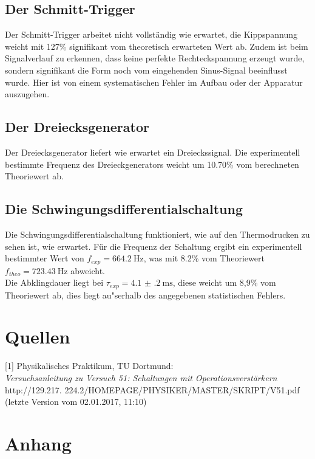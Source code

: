 \documentclass[]{scrartcl}
\let\oldsection\section
\renewcommand\section{\clearpage\oldsection}
\begin{document}
\subsection{Der Schmitt-Trigger}
Der Schmitt-Trigger arbeitet nicht vollständig wie erwartet, die Kippspannung weicht mit 127\% signifikant vom theoretisch erwarteten Wert ab. Zudem ist beim Signalverlauf zu erkennen, dass keine perfekte Rechteckspannung erzeugt wurde, sondern signifikant die Form noch vom eingehenden Sinus-Signal beeinflusst wurde. Hier ist von einem systematischen Fehler im Aufbau oder der Apparatur auszugehen.

\subsection{Der Dreiecksgenerator}
Der Dreiecksgenerator liefert wie erwartet ein Dreieckssignal. Die experimentell \\bestimmte Frequenz des Dreieckgenerators weicht um 10.70\% vom berechneten Theoriewert ab.

\subsection{Die Schwingungsdifferentialschaltung}
Die Schwingungsdifferentialschaltung funktioniert, wie auf den Thermodrucken zu sehen ist, wie erwartet. Für die Frequenz der Schaltung ergibt ein experimentell bestimmter Wert von $f_{exp}=\SI{664.2}{\hertz}$, was mit 8.2\% vom Theoriewert $f_{theo}=\SI{723.43}{\hertz}$ abweicht. \\
Die Abklingdauer liegt bei $\tau_{exp}=\SI{4.1(2)}{\milli\second}$, diese weicht um 8,9\% vom Theoriewert ab, dies liegt au"serhalb des angegebenen statistischen Fehlers.

\section{Quellen}
{[1]} Physikalisches Praktikum, TU Dortmund: \\
\textit{Versuchsanleitung zu Versuch 51: Schaltungen mit Operationsverstärkern}\\
http://129.217.
224.2/HOMEPAGE/PHYSIKER/MASTER/SKRIPT/V51.pdf (letzte Version vom 02.01.2017, 11:10)\\

\section{Anhang}
\end{document}
